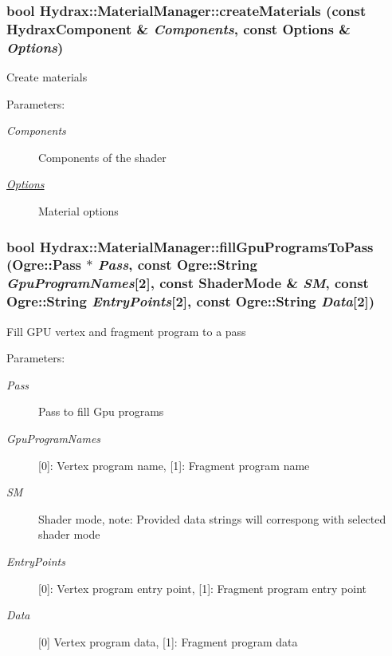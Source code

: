 \begin{CompactItemize}
{\subsubsection[{createMaterials}]{\setlength{\rightskip}{0pt plus 5cm}bool Hydrax::MaterialManager::createMaterials (const {\bf HydraxComponent} \& {\em Components}, \/  const {\bf Options} \& {\em Options})}}
\label{class_hydrax_1_1_material_manager_6aa7b0a92b824348577d506f7bcf581b}


Create materials \begin{Desc}
\item[Parameters:]
\begin{description}
\item[{\em Components}]Components of the shader \item[{\em \hyperlink{struct_hydrax_1_1_material_manager_1_1_options}{Options}}]Material options \end{description}
\end{Desc}
\hypertarget{class_hydrax_1_1_material_manager_9374e09a2d918becab5db16240d2b8e1}{
\subsubsection[{fillGpuProgramsToPass}]{\setlength{\rightskip}{0pt plus 5cm}bool Hydrax::MaterialManager::fillGpuProgramsToPass (Ogre::Pass $\ast$ {\em Pass}, \/  const Ogre::String {\em GpuProgramNames}\mbox{[}2\mbox{]}, \/  const {\bf ShaderMode} \& {\em SM}, \/  const Ogre::String {\em EntryPoints}\mbox{[}2\mbox{]}, \/  const Ogre::String {\em Data}\mbox{[}2\mbox{]})}}
\label{class_hydrax_1_1_material_manager_9374e09a2d918becab5db16240d2b8e1}


Fill GPU vertex and fragment program to a pass \begin{Desc}
\item[Parameters:]
\begin{description}
\item[{\em Pass}]Pass to fill Gpu programs \item[{\em GpuProgramNames}]\mbox{[}0\mbox{]}: Vertex program name, \mbox{[}1\mbox{]}: Fragment program name \item[{\em SM}]Shader mode, note: Provided data strings will correspong with selected shader mode \item[{\em EntryPoints}]\mbox{[}0\mbox{]}: Vertex program entry point, \mbox{[}1\mbox{]}: Fragment program entry point \item[{\em Data}]\mbox{[}0\mbox{]} Vertex program data, \mbox{[}1\mbox{]}: Fragment program data \end{description}
\end{Desc}
\hypertarget{class_hydrax_1_1_material_manager_e72ebb13cf760e473c8fdad10410fcc7}{
}
\end{CompactItemize}
